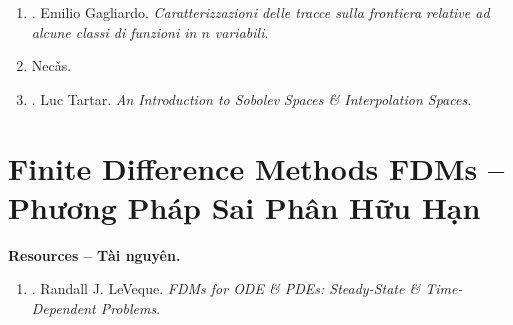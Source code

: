 \documentclass{article}
\newtheorem{theorem}{Theorem}
\begin{document}
\begin{enumerate}
\begin{itemize}
		\begin{theorem}[Hahn--Banach extension]
			Let $M$ be a subspace of the normed space $X$. If $m'\in M'$, then there exists $x'\in X'$ s.t. $\|x';X'\| = \|m';M'\|$ \& $x'(m) = m'(m)$, $\forall m\in M$.
		\end{theorem}
		
		\item {. Lebesgue Spaces $L^p(\Omega)$.}
		\item {. Sobolev Spaces $W^{m,p}(\Omega)$.}
		\item {. Sobolev imbedding theorem.}
		\item {. Interpolation, extension, \& approximation theorems.}
		\item {. Compact imbeddings of Sobolev spaces.}
		\item {. Fractional order spaces.}
		\item {. Orlicz spaces \& Orlicz-Sobolev spaces.}
	\end{itemize}
	
	
	\item \cite{Gagliardo1957}. {\sc Emilio Gagliardo}. {\it Caratterizzazioni delle tracce sulla frontiera relative ad alcune classi di funzioni in {$n$} variabili}.
	\item {\sc Nec\v{a}s}.
	\item \cite{Tartar2006}. {\sc Luc Tartar}. {\it An Introduction to Sobolev Spaces \& Interpolation Spaces}.
\end{enumerate}


\section{Finite Difference Methods FDMs -- Phương Pháp Sai Phân Hữu Hạn}
\textbf{\textsf{Resources -- Tài nguyên.}}
\begin{enumerate}
	\item \cite{LeVeque2007}. {\sc Randall J. LeVeque}. {\it FDMs for ODE \& PDEs: Steady-State \& Time-Dependent Problems}.
\end{enumerate}

\end{document}
